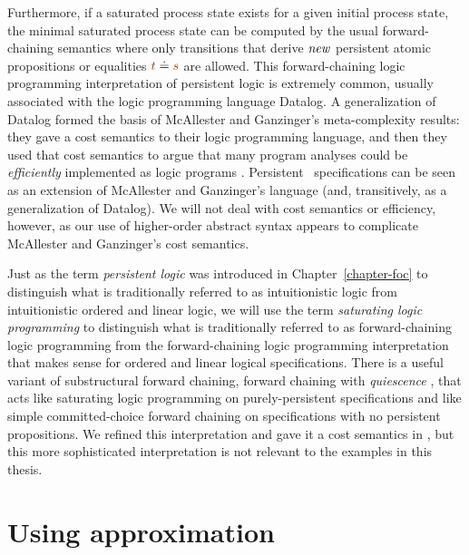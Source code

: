 Furthermore, if a saturated process state exists for a given initial
process state, the minimal saturated process state can be computed by
the usual forward-chaining semantics where only transitions that
derive ${\it new}$ persistent atomic propositions or equalities
$\lf{t} \doteq \lf{s}$ are allowed. This forward-chaining logic
programming interpretation of persistent logic is extremely common,
usually associated with the logic programming language
Datalog.  A generalization of Datalog formed the basis of McAllester
and Ganzinger's meta-complexity results: they gave a cost semantics to
their logic programming language, and then they used that cost
semantics to argue that many program analyses could be {\it
  efficiently} implemented as logic programs
\cite{mcallester02complexity,ganzinger02logical}. Persistent
\sls~specifications can be seen as an extension of McAllester and
Ganzinger's language (and, transitively, as a generalization of
Datalog). We will not deal with cost semantics or efficiency, however,
as our use of higher-order abstract syntax appears to complicate 
McAllester and
Ganzinger's cost semantics.

Just as the term {\it persistent logic} was introduced in 
Chapter~\ref{chapter-foc} to
distinguish what is traditionally referred to as intuitionistic logic
from intuitionistic ordered and linear logic, we will use the term
{\it saturating logic programming} to distinguish what is
traditionally referred to as forward-chaining logic programming from
the forward-chaining logic programming interpretation that makes sense
for ordered and linear logical specifications. There is a useful
variant of substructural forward chaining, forward chaining with {\it
  quiescence} \cite{lopez05monadic}, that acts like saturating logic
programming on purely-persistent specifications and like simple
committed-choice forward chaining on specifications with no persistent
propositions. We refined this interpretation and gave it a cost
semantics in \cite{simmons08linear}, but this more sophisticated
interpretation is not relevant to the examples in this thesis.

\section{Using approximation}
\label{sec:pda-approxme}


